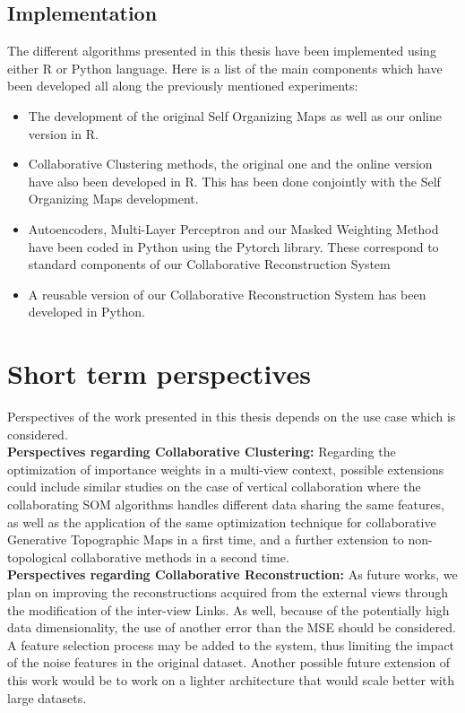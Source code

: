 \subsection{Implementation}
The different algorithms presented in this thesis have been implemented using either R or Python language. Here is a list of the main components which have been developed all along the previously mentioned experiments:
\begin{itemize}
    \item The development of the original Self Organizing Maps as well as our online version in R.
    \item Collaborative Clustering methods, the original one and the online version have also been developed in R. This has been done conjointly with the Self Organizing Maps development.
    \item Autoencoders, Multi-Layer Perceptron and our Masked Weighting Method have been coded in Python using the Pytorch library. These correspond to standard components of our Collaborative Reconstruction System
    \item A reusable version of our Collaborative Reconstruction System has been developed in Python.
\end{itemize}

\section{Short term perspectives}

Perspectives of the work presented in this thesis depends on the use case which is considered.\\

\textbf{Perspectives regarding Collaborative Clustering:} Regarding the optimization of importance weights in a multi-view context, possible extensions could include similar studies on the case of vertical collaboration where the collaborating SOM algorithms handles different data sharing the same features, as well as the application of the same optimization technique for collaborative Generative Topographic Maps in a first time, and a further extension to non-topological collaborative methods in a second time.\\

\textbf{Perspectives regarding Collaborative Reconstruction:} As future works, we plan on improving the reconstructions acquired from the external views through the modification of the inter-view Links. As well, because of the potentially high data dimensionality, the use of another error than the MSE should be considered. A feature selection process may be added to the system, thus limiting the impact of the noise features in the original dataset. Another possible future extension of this work would be to work on a lighter architecture that would scale better with large datasets. 

